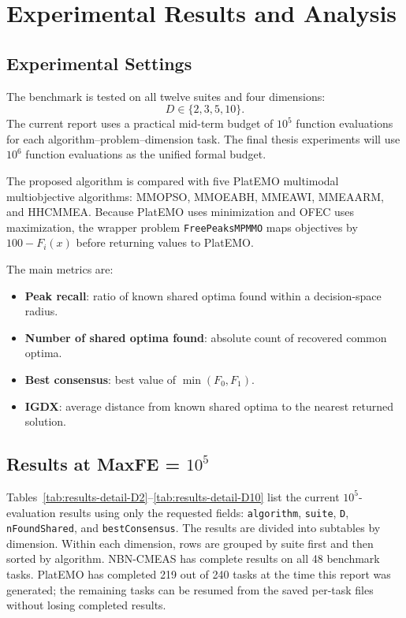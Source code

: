 \documentclass[12pt,a4paper]{article}
\newcommand{\code}[1]{\texttt{#1}}
\begin{document}
\section{Experimental Results and Analysis}

\subsection{Experimental Settings}

The benchmark is tested on all twelve suites and four dimensions:
\[
  D \in \{2,3,5,10\}.
\]
The current report uses a practical mid-term budget of $10^5$ function evaluations for
each algorithm--problem--dimension task. The final thesis experiments will use $10^6$
function evaluations as the unified formal budget.

The proposed algorithm is compared with five PlatEMO multimodal multiobjective
algorithms: MMOPSO, MMOEABH, MMEAWI, MMEAARM, and HHCMMEA. Because PlatEMO
uses minimization and OFEC uses maximization, the wrapper problem \code{FreePeaksMPMMO}
maps objectives by $100-F_i(x)$ before returning values to PlatEMO.

The main metrics are:
\begin{itemize}[leftmargin=2em]
  \item \textbf{Peak recall}: ratio of known shared optima found within a decision-space radius.
  \item \textbf{Number of shared optima found}: absolute count of recovered common optima.
  \item \textbf{Best consensus}: best value of $\min(F_0,F_1)$.
  \item \textbf{IGDX}: average distance from known shared optima to the nearest returned solution.
\end{itemize}

\subsection{Results at MaxFE = $10^5$}

Tables~\ref{tab:results-detail-D2}--\ref{tab:results-detail-D10} list the current
$10^5$-evaluation results using only the requested fields:
\code{algorithm}, \code{suite}, \code{D}, \code{nFoundShared}, and
\code{bestConsensus}. The results are divided into subtables by dimension. Within each
dimension, rows are grouped by suite first and then sorted by algorithm. NBN-CMEAS has
complete results on all 48 benchmark tasks. PlatEMO has completed 219 out of 240 tasks
at the time this report was generated; the remaining tasks can be resumed from the saved
per-task files without losing completed results.
\end{document}
